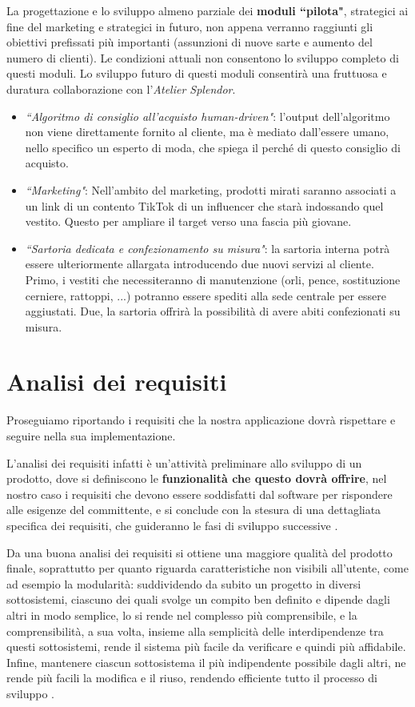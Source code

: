 \documentclass[12pt]{article}
\begin{document}
La progettazione e lo sviluppo almeno parziale dei \textbf{moduli ``pilota"}, strategici ai fine del marketing e strategici in futuro, non appena verranno raggiunti gli obiettivi prefissati più importanti (assunzioni di nuove sarte e aumento del numero di clienti). Le condizioni attuali non consentono lo sviluppo completo di questi moduli. Lo sviluppo futuro di questi moduli consentirà una fruttuosa e duratura collaborazione con l'{\em Atelier Splendor}.
\begin{itemize}
    \item {\em ``Algoritmo di consiglio all'acquisto human-driven"}: l'output dell'algoritmo non viene direttamente fornito al cliente, ma è mediato dall'essere umano, nello specifico un esperto di moda, che spiega il perché di questo consiglio di acquisto.
    \item {\em ``Marketing"}: Nell'ambito del marketing, prodotti mirati saranno associati a un link di un contento TikTok di un influencer che starà indossando quel vestito. Questo per ampliare il target verso una fascia più giovane.
    \item {\em ``Sartoria dedicata e confezionamento su misura"}: la sartoria interna potrà essere ulteriormente allargata introducendo due nuovi servizi al cliente. Primo, i vestiti che necessiteranno di manutenzione (orli, pence, sostituzione cerniere, rattoppi, ...) potranno essere spediti alla sede centrale per essere aggiustati. Due, la sartoria offrirà la possibilità di avere abiti confezionati su misura.
\end{itemize}


\section{Analisi dei requisiti}

Proseguiamo riportando i requisiti che la nostra applicazione dovrà rispettare e seguire nella sua implementazione.

L’analisi dei requisiti infatti è un’attività preliminare allo sviluppo di un prodotto, dove si definiscono le \textbf{funzionalità che questo dovrà offrire}, nel nostro caso i requisiti che devono essere soddisfatti dal software per rispondere alle esigenze del committente, e si conclude con la stesura di una dettagliata specifica dei requisiti, che guideranno le fasi di sviluppo successive \cite{up-riferimento}.

Da una buona analisi dei requisiti si ottiene una maggiore qualità del prodotto finale, soprattutto per quanto riguarda caratteristiche non visibili all’utente, come ad esempio la modularità: suddividendo da subito un progetto in diversi sottosistemi, ciascuno dei quali svolge un compito ben definito e dipende dagli altri in modo semplice, lo si rende nel complesso più comprensibile, e la comprensibilità, a sua volta, insieme alla semplicità delle interdipendenze tra questi sottosistemi, rende il sistema più facile da verificare e quindi più affidabile.
Infine, mantenere ciascun sottosistema il più indipendente possibile dagli altri, ne rende più facili la modifica e il riuso, rendendo efficiente tutto il processo di sviluppo \cite{up-riferimento}.
\end{document}

